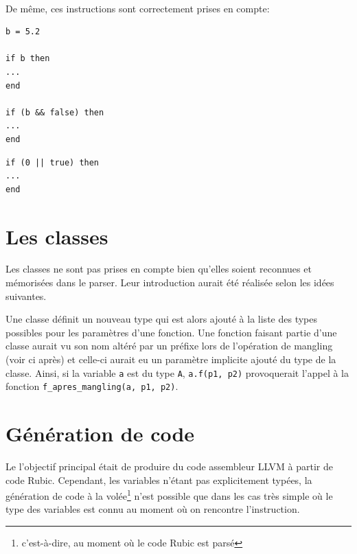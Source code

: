 \documentclass[12pt]{article}
\begin{document}
\paragraph{} De même, ces instructions sont correctement prises en compte:

\vspace{0.5cm}

\begin{minipage}{0.48\textwidth}
\begin{verbatim}
b = 5.2

if b then
...
end

if (b && false) then
...
end
\end{verbatim}
\end{minipage}
\begin{minipage}{0.48\textwidth}
\begin{verbatim}
if (0 || true) then
...
end
\end{verbatim}
\end{minipage}

\vspace{0.5cm}


\section{Les classes}

Les classes ne sont pas prises en compte bien qu'elles soient reconnues et mémorisées dans le parser. Leur introduction aurait été réalisée selon les idées suivantes.

Une classe définit un nouveau type qui est alors ajouté à la liste des types possibles pour les paramètres d'une fonction. Une fonction faisant partie d'une classe aurait vu son nom altéré par un préfixe lors de l'opération de mangling (voir ci après) et celle-ci aurait eu un paramètre implicite ajouté du type de la classe. Ainsi, si la variable \verb!a! est du type \verb!A!, \verb!a.f(p1, p2)! provoquerait l'appel à la fonction \verb!f_apres_mangling(a, p1, p2)!.

\section{Génération de code}

Le l'objectif principal était de produire du code assembleur LLVM à partir de code Rubic. Cependant, les variables n'étant pas explicitement typées, la génération de code à la volée\footnote{c'est-à-dire, au moment où le code Rubic est parsé} n'est possible que dans les cas très simple où le type des variables est connu au moment où on rencontre l'instruction.
\end{document}
